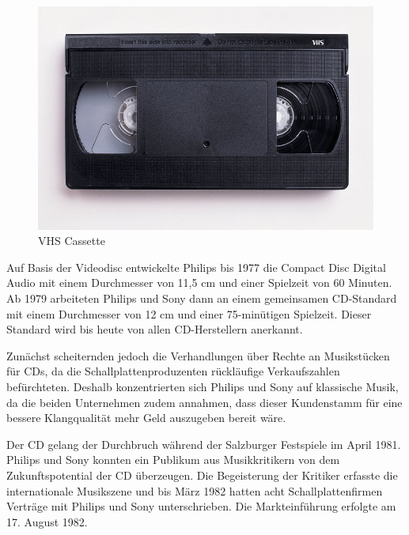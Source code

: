 \begin{figure}[h]
\begin{center}
\begin{minipage}[t]{0.3\textwidth}
            \begin{center}
                \includegraphics[height=0.1\textheight]{Bilder/Optische_Datentraeger_Die_Compact_Disc/Geschichte/vhs.png}
                \caption[VHS cassette \newline \url{https://upload.wikimedia.org/wikipedia/commons/6/67/VHS-cassette.jpg} (zuletzt aufgerufen am 19.09.2015)]{VHS Cassette}
                \label{fig:vhs}
            \end{center}
        \end{minipage}
    \end{center}
\end{figure}

Auf Basis der Videodisc entwickelte Philips bis 1977 die Compact Disc Digital
Audio mit einem Durchmesser von 11,5 cm und einer Spielzeit von 60 Minuten. Ab
1979 arbeiteten Philips und Sony dann an einem gemeinsamen CD-Standard mit einem
Durchmesser von 12 cm und einer 75-minütigen Spielzeit. Dieser Standard wird bis
heute von allen CD-Herstellern anerkannt. \cite{cds}

Zunächst scheiternden jedoch die Verhandlungen über Rechte an Musikstücken für
CDs, da die Schallplattenproduzenten rückläufige Verkaufszahlen befürchteten.
Deshalb konzentrierten sich Philips und Sony auf klassische Musik, da die beiden
Unternehmen zudem annahmen, dass dieser Kundenstamm für eine bessere
Klangqualität mehr Geld auszugeben bereit wäre.

Der CD gelang der Durchbruch während der Salzburger Festspiele im April 1981.
Philips und Sony konnten ein Publikum aus Musikkritikern von dem
Zukunftspotential der CD überzeugen. Die Begeisterung der Kritiker erfasste die
internationale Musikszene und bis März 1982 hatten acht Schallplattenfirmen
Verträge mit Philips und Sony unterschrieben. Die Markteinführung erfolgte am
17. August 1982. \cite{cuz}

